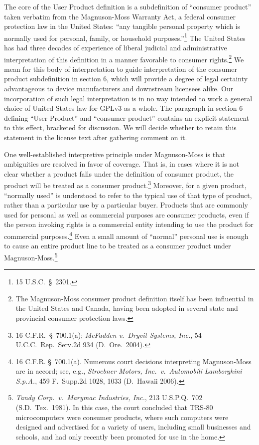 The core of the User Product definition is a subdefinition of ``consumer
product'' taken verbatim from the Magnuson-Moss Warranty Act, a federal
consumer protection law in the United States: ``any tangible personal
property which is normally used for personal, family, or household
purposes.''\footnote{15 U.S.C.~\S\ 2301.}  The United States has had
three decades of experience of liberal judicial and administrative
interpretation of this definition in a manner favorable to consumer
rights.\footnote{The Magnuson-Moss consumer product definition itself
has been influential in the United States and Canada, having been
adopted in several state and provincial consumer protection laws.}  We
mean for this body of interpretation to guide interpretation of the
consumer product subdefinition in section 6, which will provide a degree
of legal certainty advantageous to device manufacturers and downstream
licensees alike.  Our incorporation of such legal interpretation is in
no way intended to work a general choice of United States law for GPLv3
as a whole.  The paragraph in section 6 defining ``User Product'' and
``consumer product'' contains an explicit statement to this effect,
bracketed for discussion.  We will decide whether to retain this
statement in the license text after gathering comment on it.

One well-established interpretive principle under Magnuson-Moss is that
ambiguities are resolved in favor of coverage.  That is, in cases where
it is not clear whether a product falls under the definition of consumer
product, the product will be treated as a consumer product.\footnote{16
C.F.R.~\S\ 700.1(a); \textit{McFadden v.~Dryvit Systems, Inc.}, 54
U.C.C.~Rep.~Serv.2d 934 (D.~Ore.~2004).}  Moreover, for a given product,
``normally used'' is understood to refer to the typical use of that type
of product, rather than a particular use by a particular buyer.
Products that are commonly used for personal as well as commercial
purposes are consumer products, even if the person invoking rights is a
commercial entity intending to use the product for commercial
purposes.\footnote{16 C.F.R. \S \ 700.1(a).  Numerous court decisions
interpreting Magnuson-Moss are in accord; see, e.g., \textit{Stroebner
Motors, Inc.~v.~Automobili Lamborghini S.p.A.}, 459 F.~Supp.2d 1028,
1033 (D.~Hawaii 2006).}  Even a small amount of ``normal'' personal use
is enough to cause an entire product line to be treated as a consumer
product under Magnuson-Moss.\footnote{\textit{Tandy Corp.~v.~Marymac
Industries, Inc.}, 213 U.S.P.Q.~702 (S.D.~Tex.~1981). In this case, the
court concluded that TRS-80 microcomputers were consumer products, where
such computers were designed and advertised for a variety of users,
including small businesses and schools, and had only recently been
promoted for use in the home.}

